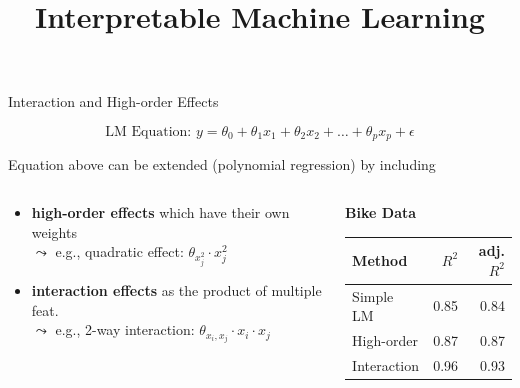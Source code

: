 \documentclass[11pt,compress,t,notes=noshow, aspectratio=169, xcolor=table]{beamer}
\title{Interpretable Machine Learning}
\date{}
\begin{document}
\newcommand{\titlefigure}{figure/lm_example}
\newcommand{\learninggoals}{
\item Inclusion of high-order and interaction effects
\item Regularization via LASSO
}


\begin{frame}{Interaction and High-order Effects}

$$\text{LM Equation: } y = \theta_0 + \theta_1 x_1 + \theta_2 x_2 + \dots + \theta_p x_p + \epsilon$$

Equation above can be extended (polynomial regression) by including

\begin{columns}[T, totalwidth=\linewidth]
\begin{column}{0.65\linewidth}
    \begin{itemize}
        \item \textbf{high-order effects} which have their own weights\\
        $\leadsto$ e.g., quadratic effect: $\theta_{x_j^2} \cdot x_j^2$
        \item \textbf{interaction effects} as the product of multiple feat.\\
        $\leadsto$ e.g., 2-way interaction: $\theta_{x_i, x_j} \cdot x_i \cdot x_j$
    \end{itemize}
\end{column}
\begin{column}{0.34\linewidth}
    \vspace{-0.2cm}
    \centering
    \begin{scriptsize}
    \begin{table}[ht]
    \textbf{Bike Data}
        \begin{tabular}{lrr}
        \hline
        Method & $R^2$ & adj. $R^2$ \\ 
        \hline
        Simple LM & 0.85 & 0.84 \\ 
        High-order & 0.87 & 0.87 \\ 
        Interaction  & 0.96 & 0.93 \\ 
        \hline
        \end{tabular}
    \end{table}
    \end{scriptsize}
\end{column}
\end{columns}


\end{frame}
\end{document}
